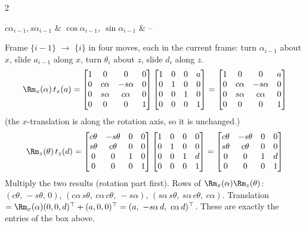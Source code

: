 \begin{multicols}{2}
\begin{fbx}
\begin{symbols}
$c\alpha_{i-1},s\alpha_{i-1}$ & $\cos\alpha_{i-1},\ \sin\alpha_{i-1}$ & --\\
\end{symbols}
\end{fbx}
\begin{deriv}
Frame $\{i{-}1\}$ \(\to\) $\{i\}$ in four moves, each in the current frame: turn $\alpha_{i-1}$ about $x$, slide $a_{i-1}$ along $x$, turn $\theta_i$ about $z$, slide $d_i$ along $z$.
\[\Rm_x(\alpha)\,t_x(a)=\begin{bmatrix}1&0&0&0\\0&c\alpha&-s\alpha&0\\0&s\alpha&c\alpha&0\\0&0&0&1\end{bmatrix}\begin{bmatrix}1&0&0&a\\0&1&0&0\\0&0&1&0\\0&0&0&1\end{bmatrix}=\begin{bmatrix}1&0&0&a\\0&c\alpha&-s\alpha&0\\0&s\alpha&c\alpha&0\\0&0&0&1\end{bmatrix}\]
(the $x$-translation is along the rotation axis, so it is unchanged.)
\[\Rm_z(\theta)\,t_z(d)=\begin{bmatrix}c\theta&-s\theta&0&0\\s\theta&c\theta&0&0\\0&0&1&0\\0&0&0&1\end{bmatrix}\begin{bmatrix}1&0&0&0\\0&1&0&0\\0&0&1&d\\0&0&0&1\end{bmatrix}=\begin{bmatrix}c\theta&-s\theta&0&0\\s\theta&c\theta&0&0\\0&0&1&d\\0&0&0&1\end{bmatrix}\]
Multiply the two results (rotation part first). Rows of $\Rm_x(\alpha)\Rm_z(\theta)$: $(c\theta,\,-s\theta,\,0)$, $(c\alpha\,s\theta,\ c\alpha\,c\theta,\ -s\alpha)$, $(s\alpha\,s\theta,\ s\alpha\,c\theta,\ c\alpha)$. Translation $=\Rm_x(\alpha)(0,0,d)^\top+(a,0,0)^\top=(a,\ -s\alpha\,d,\ c\alpha\,d)^\top$. These are exactly the entries of the box above. \added
\end{deriv}


\end{multicols}
